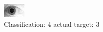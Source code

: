 \begin{figure}[h!]
\begin{center}
\includegraphics[width=0.60\columnwidth]{figures/ID1917_class_4_target_3.png}
\end{center}
\caption{ Classification: 4 actual target: 3}
\label{fig:ID1917_class_4_target_3}
\end{figure}
